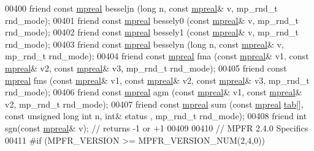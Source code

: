 \begin{DoxyCode}
00400     \textcolor{keyword}{friend} \textcolor{keyword}{const} \hyperlink{classmpfr_1_1mpreal}{mpreal} besseljn (\textcolor{keywordtype}{long} n, \textcolor{keyword}{const} \hyperlink{classmpfr_1_1mpreal}{mpreal}& v, mp\_rnd\_t rnd\_mode);
00401     \textcolor{keyword}{friend} \textcolor{keyword}{const} \hyperlink{classmpfr_1_1mpreal}{mpreal} bessely0 (\textcolor{keyword}{const} \hyperlink{classmpfr_1_1mpreal}{mpreal}& v, mp\_rnd\_t rnd\_mode);
00402     \textcolor{keyword}{friend} \textcolor{keyword}{const} \hyperlink{classmpfr_1_1mpreal}{mpreal} bessely1 (\textcolor{keyword}{const} \hyperlink{classmpfr_1_1mpreal}{mpreal}& v, mp\_rnd\_t rnd\_mode);
00403     \textcolor{keyword}{friend} \textcolor{keyword}{const} \hyperlink{classmpfr_1_1mpreal}{mpreal} besselyn (\textcolor{keywordtype}{long} n, \textcolor{keyword}{const} \hyperlink{classmpfr_1_1mpreal}{mpreal}& v, mp\_rnd\_t rnd\_mode);
00404     \textcolor{keyword}{friend} \textcolor{keyword}{const} \hyperlink{classmpfr_1_1mpreal}{mpreal} fma      (\textcolor{keyword}{const} \hyperlink{classmpfr_1_1mpreal}{mpreal}& v1, \textcolor{keyword}{const} \hyperlink{classmpfr_1_1mpreal}{mpreal}& v2, \textcolor{keyword}{const} 
      \hyperlink{classmpfr_1_1mpreal}{mpreal}& v3, mp\_rnd\_t rnd\_mode);
00405     \textcolor{keyword}{friend} \textcolor{keyword}{const} \hyperlink{classmpfr_1_1mpreal}{mpreal} fms      (\textcolor{keyword}{const} \hyperlink{classmpfr_1_1mpreal}{mpreal}& v1, \textcolor{keyword}{const} \hyperlink{classmpfr_1_1mpreal}{mpreal}& v2, \textcolor{keyword}{const} 
      \hyperlink{classmpfr_1_1mpreal}{mpreal}& v3, mp\_rnd\_t rnd\_mode);
00406     \textcolor{keyword}{friend} \textcolor{keyword}{const} \hyperlink{classmpfr_1_1mpreal}{mpreal} agm      (\textcolor{keyword}{const} \hyperlink{classmpfr_1_1mpreal}{mpreal}& v1, \textcolor{keyword}{const} \hyperlink{classmpfr_1_1mpreal}{mpreal}& v2, mp\_rnd\_t rnd\_mode);
00407     \textcolor{keyword}{friend} \textcolor{keyword}{const} \hyperlink{classmpfr_1_1mpreal}{mpreal} sum      (\textcolor{keyword}{const} \hyperlink{classmpfr_1_1mpreal}{mpreal} \hyperlink{structtab}{tab}[], \textcolor{keyword}{const} \textcolor{keywordtype}{unsigned} \textcolor{keywordtype}{long} \textcolor{keywordtype}{int} n, \textcolor{keywordtype}{int}& status
      , mp\_rnd\_t rnd\_mode);
00408     \textcolor{keyword}{friend} \textcolor{keywordtype}{int} sgn(\textcolor{keyword}{const} \hyperlink{classmpfr_1_1mpreal}{mpreal}& v); \textcolor{comment}{// returns -1 or +1}
00409 
00410 \textcolor{comment}{// MPFR 2.4.0 Specifics}
00411 \textcolor{preprocessor}{#if (MPFR\_VERSION >= MPFR\_VERSION\_NUM(2,4,0))}

\end{DoxyCode}
